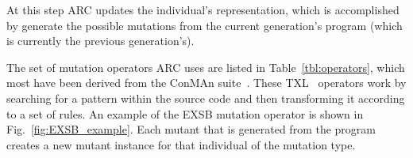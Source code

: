 \documentclass{llncs}
\begin{document}
At this step ARC updates the individual's representation, which is accomplished
by generate the possible mutations from the current generation's program (which
is currently the previous generation's).



The set of mutation operators ARC uses are listed in Table~\ref{tbl:operators},
which most have been derived from the ConMAn suite~\cite{BCD06}. These
TXL~\cite{CHP91} operators work by searching for a pattern within the source
code and then transforming it according to a set of rules. An example of the
EXSB mutation operator is shown in Fig.~\ref{fig:EXSB_example}. Each mutant
that is generated from the program creates a new mutant instance for that
individual of the mutation type.
\end{document}
